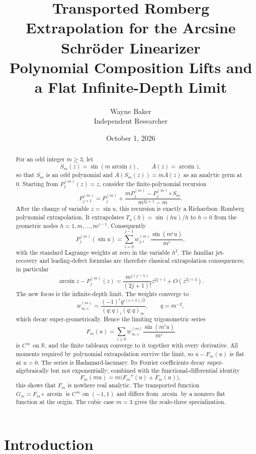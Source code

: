 \documentclass[11pt]{article}
\title{Transported Romberg Extrapolation for the Arcsine Schr\"oder Linearizer\\
\large Polynomial Composition Lifts and a Flat Infinite-Depth Limit}
\author{Wayne Baker\\Independent Researcher}
\date{October 1, 2026}
\theoremstyle{remark}
\begin{document}
\maketitle

\begin{abstract}
For an odd integer $m\ge3$, let
\[
S_m(z)=\sin(m\arcsin z),
\qquad A(z)=\arcsin z,
\]
so that $S_m$ is an odd polynomial and $A(S_m(z))=mA(z)$ as an analytic germ at
$0$.  Starting from $P^{(m)}_1(z)=z$, consider the finite-polynomial recursion
\[
P^{(m)}_{j+1}
=P^{(m)}_j+
\frac{mP^{(m)}_j-P^{(m)}_j\circ S_m}{m^{2j+1}-m}.
\]
After the change of variable $z=\sin u$, this recursion is exactly a
Richardson--Romberg polynomial extrapolation.  It extrapolates
$T_u(h)=\sin(hu)/h$ to $h=0$ from the geometric nodes
$h=1,m,\ldots,m^{j-1}$.  Consequently
\[
P^{(m)}_j(\sin u)=\sum_{i=0}^{j-1}w^{(m)}_{j,i}\frac{\sin(m^i u)}{m^i},
\]
with the standard Lagrange weights at zero in the variable $h^2$.  The familiar
jet-recovery and leading-defect formulas are therefore classical extrapolation
consequences; in particular
\[
\arcsin z-P^{(m)}_j(z)
=\frac{m^{j(j-1)}}{(2j+1)!}z^{2j+1}+O(z^{2j+3}).
\]
The new focus is the infinite-depth limit.  The weights converge to
\[
w^{(m)}_{\infty,i}
=\frac{(-1)^i q^{i(i+1)/2}}
{(q;q)_i(q;q)_\infty},\qquad q=m^{-2},
\]
which decay super-geometrically.  Hence the limiting trigonometric series
\[
F_m(u)=\sum_{i\ge0}w^{(m)}_{\infty,i}
\frac{\sin(m^i u)}{m^i}
\]
is $C^\infty$ on $\mathbb R$, and the finite tableaux converge to it together
with every derivative.  All moments required by polynomial extrapolation
survive the limit, so $u-F_m(u)$ is flat at $u=0$.  The series is Hadamard-lacunary.  Its Fourier coefficients decay
super-algebraically but not exponentially; combined with the
functional-differential identity
\[
F_m(mu)=m\bigl(F_m''(u)+F_m(u)\bigr),
\]
this shows that $F_m$ is nowhere real analytic.  The transported function
$G_m=F_m\circ\arcsin$ is $C^\infty$ on $(-1,1)$ and differs from $\arcsin$
by a nonzero flat function at the origin.  The cubic case $m=3$ gives the
scale-three specialization.
\end{abstract}

\section{Introduction}
\end{document}
